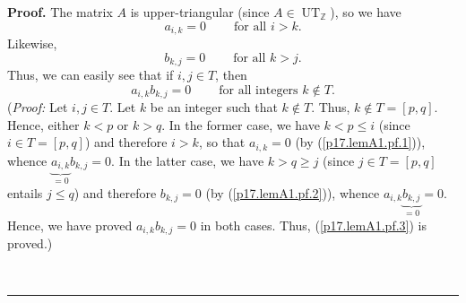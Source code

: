 \documentclass[numbers=enddot,12pt,final,onecolumn,notitlepage]{scrartcl}%
\theoremstyle{definition}
\newenvironment{proof}[1][Proof]{\noindent\textbf{#1.} }{\ \rule{0.5em}{0.5em}}
\begin{document}
\begin{enumerate}
\begin{proof}
The matrix $A$ is upper-triangular (since $A\in\operatorname*{UT}%
\nolimits_{\mathbb{Z}}$), so we have%
\begin{equation}
a_{i,k}=0\ \ \ \ \ \ \ \ \ \ \text{for all }i>k. \label{p17.lemA1.pf.1}%
\end{equation}
Likewise,%
\begin{equation}
b_{k,j}=0\ \ \ \ \ \ \ \ \ \ \text{for all }k>j. \label{p17.lemA1.pf.2}%
\end{equation}
Thus, we can easily see that if $i,j\in T$, then%
\begin{equation}
a_{i,k}b_{k,j}=0\ \ \ \ \ \ \ \ \ \ \text{for all integers }k\notin T.
\label{p17.lemA1.pf.3}%
\end{equation}
(\textit{Proof:} Let $i,j\in T$. Let $k$ be an integer such that $k\notin T$.
Thus, $k\notin T=\left[  p,q\right]  $. Hence, either $k<p$ or $k>q$. In the
former case, we have $k<p\leq i$ (since $i\in T=\left[  p,q\right]  $) and
therefore $i>k$, so that $a_{i,k}=0$ (by (\ref{p17.lemA1.pf.1})), whence
$\underbrace{a_{i,k}}_{=0}b_{k,j}=0$. In the latter case, we have $k>q\geq j$
(since $j\in T=\left[  p,q\right]  $ entails $j\leq q$) and therefore
$b_{k,j}=0$ (by (\ref{p17.lemA1.pf.2})), whence $a_{i,k}\underbrace{b_{k,j}%
}_{=0}=0$. Hence, we have proved $a_{i,k}b_{k,j}=0$ in both cases. Thus,
(\ref{p17.lemA1.pf.3}) is proved.)


\end{proof}
\end{enumerate}
\end{document}
